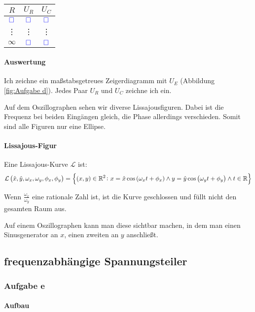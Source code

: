 \documentclass[11pt, ngerman]{article}
\newcommand{\messwert}{\textcolor{blue}{\square}}
\begin{document}
\begin{table}[h!]
	\centering
	\begin{tabular}{ccc}
		$R$ & $U_R$ & $U_C$ \\
		\hline
		$\messwert$ & $\messwert$ & $\messwert$ \\
			 \vdots & 	 \vdots & \vdots \\
		$\infty$ & $\messwert$ & $\messwert$ \\
	\end{tabular}
\end{table}

\paragraph{Auswertung}

Ich zeichne ein maßstabsgetreues Zeigerdiagramm mit $U_E$ (Abbildung
\ref{fig:Aufgabe d}). Jedes Paar $U_R$ und $U_C$ zeichne ich ein.

Auf dem Oszillographen sehen wir diverse Lissajousfiguren. Dabei ist die
Frequenz bei beiden Eingängen gleich, die Phase allerdings verschieden. Somit
sind alle Figuren nur eine Ellipse.

\paragraph{Lissajous-Figur}

Eine Lissajous-Kurve $\mathcal L$ ist:
\[
	\mathcal L\del{\hat x, \hat y, \omega_x, \omega_y, \phi_x, \phi_y} =
	\set{
		(x, y) \in \mathbb R^2
		\colon x = \hat x \cos\del{\omega_x t + \phi_x}
		\wedge y = \hat y \cos\del{\omega_y t + \phi_y}
		\wedge t \in \mathbb R
	}
\]

Wenn $\frac{\omega_x}{\omega_y}$ eine rationale Zahl ist, ist die Kurve
geschlossen und füllt nicht den gesamten Raum aus.

Auf einem Oszillographen kann man diese sichtbar machen, in dem man einen
Sinusgenerator an $x$, einen zweiten an $y$ anschließt.

\subsection{frequenzabhängige Spannungsteiler}

\subsubsection{Aufgabe e}

\paragraph{Aufbau}
\end{document}
